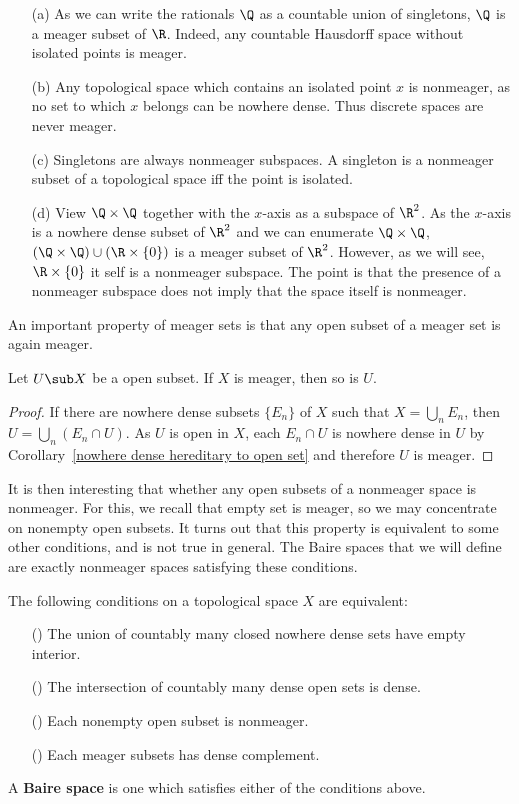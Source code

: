 \begin{example}
\mbox{}
\begin{itemize}
\item[(a)] As we can write the rationals $\Q$ as a countable union of singletons, $\Q$ is a meager subset of $\R$. Indeed, any countable Hausdorff space without isolated points is meager.
\item[(b)] Any topological space which contains an isolated point $x$ is nonmeager, as no set to which $x$ belongs can be nowhere dense. Thus discrete spaces are never meager.
\item[(c)] Singletons are always nonmeager subspaces. A singleton is a nonmeager subset of a topological space iff the point is isolated.
\item[(d)] View $\Q\times\Q$ together with the $x$-axis as a subspace of $\R^2$. As the $x$-axis is a nowhere dense subset of $\R^2$ and we can enumerate $\Q\times\Q$, $(\Q\times\Q)\cup(\R\times\{0\})$ is a meager subset of $\R^2$. However, as we will see, $\R\times\{0\}$ it self is a nonmeager subspace. The point is that the presence of a nonmeager subspace does not imply that the space itself is nonmeager.
\end{itemize}
\end{example}
An important property of meager sets is that any open subset of a meager set is again meager.
\begin{proposition}\label{meager open subset is meager}
Let $U\sub X$ be a open subset. If $X$ is meager, then so is $U$.
\end{proposition}
\begin{proof}
If there are nowhere dense subsets $\{E_n\}$ of $X$ such that $X=\bigcup_nE_n$, then $U=\bigcup_n(E_n\cap U)$. As $U$ is open in $X$, each $E_n\cap U$ is nowhere dense in $U$ by Corollary~\ref{nowhere dense hereditary to open set} and therefore $U$ is meager.
\end{proof}
It is then interesting that whether any open subsets of a nonmeager space is nonmeager. For this, we recall that empty set is meager, so we may concentrate on nonempty open subsets. It turns out that this property is equivalent to some other conditions, and is not true in general. The Baire spaces that we will define are exactly nonmeager spaces satisfying these conditions.
\begin{theorem}\label{Baire space iff}
The following conditions on a topological space $X$ are equivalent:
\begin{itemize}
\item[(\rmnum{1})] The union of countably many closed nowhere dense sets have empty interior.
\item[(\rmnum{2})] The intersection of countably many dense open sets is dense.
\item[(\rmnum{3})] Each nonempty open subset is nonmeager.
\item[(\rmnum{4})] Each meager subsets has dense complement.
\end{itemize}
A \textbf{Baire space} is one which satisfies either of the conditions above.
\end{theorem}
